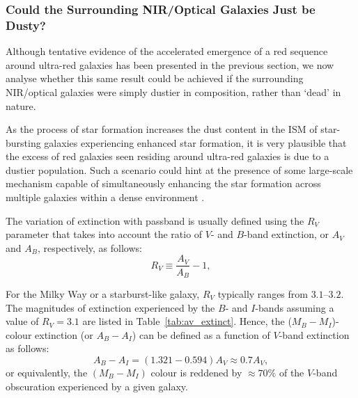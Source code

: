 \documentclass[a4paper, fleqn, usenatbib]{mnras}
\begin{document}
\subsubsection[Dusty Surrounding NIR/Optical Galaxies]{Could the Surrounding NIR/Optical Galaxies Just be Dusty?}
\label{sec:av_extinct}

Although tentative evidence of the accelerated emergence of a red sequence around ultra-red galaxies has been presented in the previous section, we now analyse whether this same result could be achieved if the surrounding NIR/optical galaxies were simply dustier in composition, rather than `dead' in nature.

As the process of star formation increases the dust content in the ISM of star-bursting galaxies experiencing enhanced star formation, it is very plausible that the excess of red galaxies seen residing around ultra-red galaxies is due to a dustier population.
Such a scenario could hint at the presence of some large-scale mechanism capable of simultaneously enhancing the star formation across multiple galaxies within a dense environment .

The variation of extinction with passband is usually defined using the $R_V$ parameter that takes into account the ratio of $V\text{-}$ and $B\text{-}$band extinction, or $A_V$ and $A_B$, respectively, as follows:
\begin{equation}
    R_V\equiv\frac{A_V}{A_B}-1,
\end{equation}

For the Milky Way or a starburst-like galaxy, $R_V$ typically ranges from $3.1\text{--}3.2$.
The magnitudes of extinction experienced by the $B\text{-}$ and $I$-bands assuming a value of $R_V=3.1$ are listed in Table~\ref{tab:av_extinct}.
Hence, the ($M_B-M_I$)-colour extinction (or $A_B - A_I$) can be defined as a function of $V$-band extinction as follows:
\begin{equation}
    \label{eq:av_extinct}
    A_B - A_I = (1.321-0.594)A_V \approx 0.7A_V,
\end{equation}
\noindent or equivalently, the $(M_B-M_I)$ colour is reddened by $\approx70\%$ of the $V\text{-}$band obscuration experienced by a given galaxy.
\end{document}

